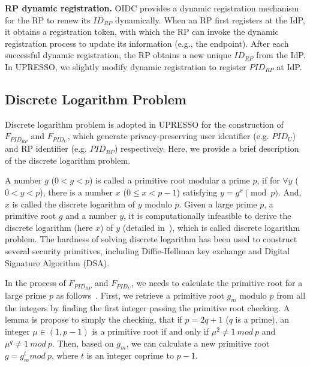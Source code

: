 \noindent\textbf{RP dynamic registration.} OIDC provides a dynamic registration mechanism~\cite{DynamicRegistration} for the RP to renew its $ID_{RP}$ dynamically. 
When an RP first registers at the IdP, it obtains a registration token, with which the  RP can invoke the dynamic registration process to
update its information (e.g., the endpoint). 
After each successful dynamic registration, the RP obtains a new unique $ID_{RP}$ from the IdP.
In UPRESSO, we slightly modify dynamic registration to register $PID_{RP}$ at IdP. 


\subsection{Discrete Logarithm Problem}
\label{sec:dlp}
Discrete logarithm problem is adopted in UPRESSO for the construction of $F_{PID_{RP}}$ and $F_{PID_U}$,
 which generate privacy-preserving user identifier (e.g. $PID_U$) and RP identifier (e.g. $PID_{RP}$) respectively.
Here, we provide a brief description of the discrete logarithm problem.

A number $g$ ($0<g<p$) is called a primitive root modular a prime $p$, if for ${\forall}y$ ($0<y<p$), there is a  number $x$ ($0\le x <p-1$) satisfying $y=g^x \pmod p$.
And, $x$ is called the discrete logarithm of $y$ modulo $p$. Given a large prime $p$, a primitive root $g$ and a number $y$, it is computationally infeasible to derive the discrete logarithm (here $x$) of $y$ (detailed in~\cite{WXWM}), which is called discrete logarithm problem.
The hardness of solving discrete logarithm has been used to construct several security primitives, including Diffie-Hellman key exchange and Digital Signature Algorithm (DSA).

In the process of $F_{PID_{RP}}$ and $F_{PID_U}$, we needs to calculate the primitive root for a  large prime $p$ as follows~\cite{Shoup,Wang}.
First, we retrieve a primitive root $g_m$  modulo $p$ from all the integers by finding the first integer passing  the primitive root checking.
 A lemma is propose to simply the checking, that if $p=2q+1$ ($q$ is a prime),  an integer $\mu \in (1, p-1)$ is a primitive root if and only if $\mu^2\neq 1 \ mod \ p$ and $\mu^q\neq 1 \ mod \ p$.
Then, based on $g_m$, we can calculate a new primitive root $g = g_{m}^{t} mod \ p$, where $t$ is an integer coprime to $p-1$.
 


